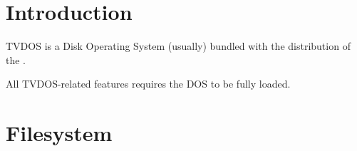 \chapter{Introduction}

TVDOS is a Disk Operating System (usually) bundled with the distribution of the \thismachine.

All TVDOS-related features requires the DOS to be fully loaded.

\chapter{Filesystem}
